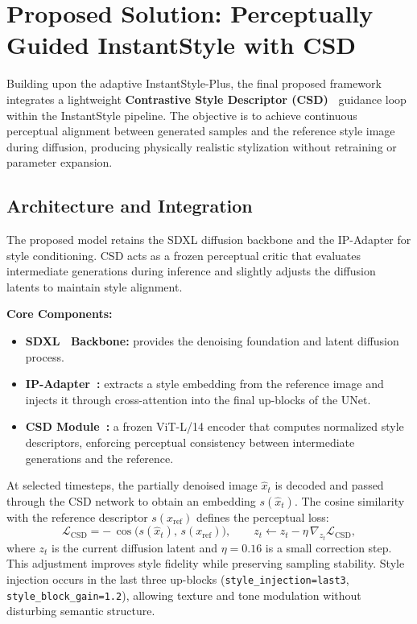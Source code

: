 \chapter{Proposed Solution: Perceptually Guided InstantStyle with CSD}
\label{chap:proposed_csd}

\noindent
Building upon the adaptive InstantStyle-Plus, the final proposed framework integrates a lightweight \textbf{Contrastive Style Descriptor (CSD)~\cite{somepalli2024csd}} guidance loop within the InstantStyle pipeline.  
The objective is to achieve continuous perceptual alignment between generated samples and the reference style image during diffusion, producing physically realistic stylization without retraining or parameter expansion.

\section{Architecture and Integration}

The proposed model retains the SDXL diffusion backbone and the IP-Adapter for style conditioning.  
CSD acts as a frozen perceptual critic that evaluates intermediate generations during inference and slightly adjusts the diffusion latents to maintain style alignment.

\textbf{Core Components:}
\begin{itemize}
    \item \textbf{SDXL~\cite{podell2023sdxl} Backbone:} provides the denoising foundation and latent diffusion process.
    \item \textbf{IP-Adapter~\cite{chen2023ipadapter}:} extracts a style embedding from the reference image and injects it through cross-attention into the final up-blocks of the UNet.
    \item \textbf{CSD Module~\cite{somepalli2024csd}:} a frozen ViT-L/14 encoder that computes normalized style descriptors, enforcing perceptual consistency between intermediate generations and the reference.
\end{itemize}

At selected timesteps, the partially denoised image $\hat{x}_t$ is decoded and passed through the CSD network to obtain an embedding \(s(\hat{x}_t)\).  
The cosine similarity with the reference descriptor \(s(x_{\text{ref}})\) defines the perceptual loss:
\[
\mathcal{L}_{\text{CSD}} = -\,\cos\!\big(s(\hat{x}_t),\, s(x_{\text{ref}})\big),
\qquad
z_t \leftarrow z_t - \eta\,\nabla_{z_t}\mathcal{L}_{\text{CSD}},
\]
where \(z_t\) is the current diffusion latent and \(\eta=0.16\) is a small correction step.  
This adjustment improves style fidelity while preserving sampling stability.  
Style injection occurs in the last three up-blocks (\texttt{style\_injection=last3}, \texttt{style\_block\_gain=1.2}), allowing texture and tone modulation without disturbing semantic structure.

